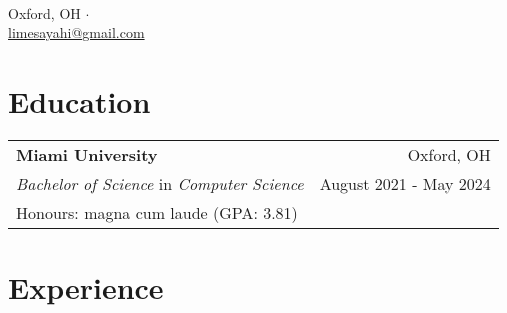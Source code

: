 \documentclass[letterpaper,8pt]{article} %
\begin{document}
\pagestyle{empty}
\par
{\\
\footnotesize{
Oxford, OH
$\cdot$
\href{tel:+1-513-484-0972}{\color{black}{+1 (513) 484-0972}}\\
\href{mailto:limesayahi@gmail.com}{\color{black}limesayahi@gmail.com}\\
}}
\section{Education}
\footnotesize{
\begin{tabular*}{\linewidth}{@{\extracolsep{\fill}} lr }
\textbf{Miami University} & Oxford, OH\\
\emph{Bachelor of Science} in \emph{Computer Science} & August 2021 - May 2024\\
\multicolumn{2}{p{\linewidth}}{Honours: magna cum laude (GPA\@: 3.81)}
\end{tabular*}}

\section{Experience}
\end{document}
